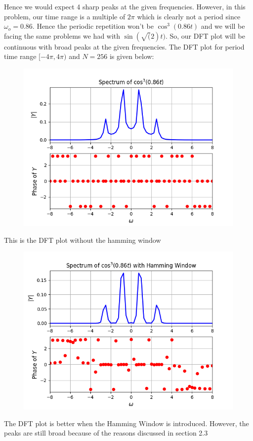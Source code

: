 \documentclass[12pt, a4paper]{article}
\begin{document}
Hence we would expect 4 sharp peaks at the given frequencies. However, in this problem, our time range is a multiple of $2\pi$ which is clearly not a period since $\omega_{o}=0.86$. Hence the periodic repetition won't be $\cos^{3}(0.86t)$ and we will be facing the same problems we had with $\sin(\sqrt(2)t)$. So, our DFT plot will be continuous with broad peaks at the given frequencies. The DFT plot for period time range $[-4\pi,4\pi)$ and $N=256$ is given below:
\begin{figure}[H]
    \centering
    \includegraphics[scale = 0.8]{Figure_9.png}
    \label{fig:sample}
\end{figure}
\begin{center}
    This is the DFT plot without the hamming window
\end{center}
\begin{figure}[H]
    \centering
    \includegraphics[scale = 0.8]{Figure_10.png}
    \label{fig:sample}
\end{figure}
\begin{center}
    The DFT plot is better when the Hamming Window is introduced. However, the peaks are still broad because of the reasons discussed in section 2.3
\end{center}
\end{document}
